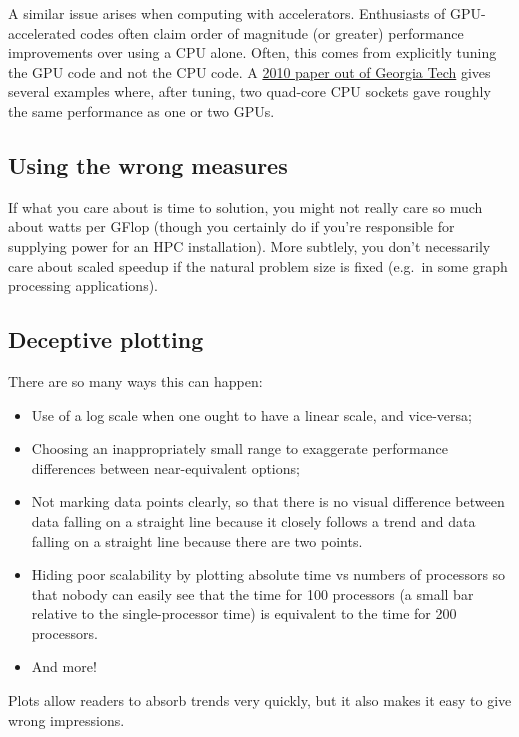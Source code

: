 \documentclass[12pt, leqno]{article} %
\begin{document}
A similar issue arises when computing with accelerators. Enthusiasts of
GPU-accelerated codes often claim order of magnitude (or greater)
performance improvements over using a CPU alone. Often, this comes from
explicitly tuning the GPU code and not the CPU code. A
\href{http://newport.eecs.uci.edu/~amowli/resources/papers/vuduc2010-hotpar.pdf}{2010
paper out of Georgia Tech} gives several examples where, after tuning,
two quad-core CPU sockets gave roughly the same performance as one or
two GPUs.

\subsection{Using the wrong measures}

If what you care about is time to solution, you might not really care so
much about watts per GFlop (though you certainly do if you're
responsible for supplying power for an HPC installation). More subtlely,
you don't necessarily care about scaled speedup if the natural problem
size is fixed (e.g.~in some graph processing applications).

\subsection{Deceptive plotting}

There are so many ways this can happen:

\begin{itemize}
\item
  Use of a log scale when one ought to have a linear scale, and
  vice-versa;
\item
  Choosing an inappropriately small range to exaggerate performance
  differences between near-equivalent options;
\item
  Not marking data points clearly, so that there is no visual difference
  between data falling on a straight line because it closely follows a
  trend and data falling on a straight line because there are two
  points.
\item
  Hiding poor scalability by plotting absolute time vs numbers of
  processors so that nobody can easily see that the time for 100
  processors (a small bar relative to the single-processor time) is
  equivalent to the time for 200 processors.
\item
  And more!
\end{itemize}

Plots allow readers to absorb trends very quickly, but it also makes it
easy to give wrong impressions.
\end{document}
